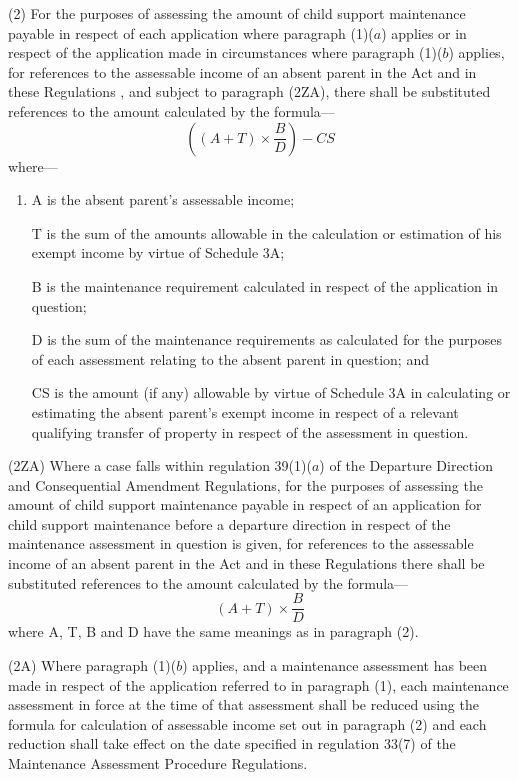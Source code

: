 \documentclass[a4paper]{article}
\begin{document}
(2) For the purposes of assessing the amount of child support maintenance payable in respect of each application where 
paragraph (1)($a$)  %
applies
or in respect of the application made in circumstances where paragraph (1)($b$) applies, %
for references to the assessable income of an absent parent in the Act and in these Regulations%
, and subject to paragraph (2ZA),  %
there shall be substituted references to the amount calculated by the formula—
\[ \left( (A + T) \times \frac{B}{D}\right) - CS\]
where—
\begin{enumerate}\item[]
A is the absent parent’s assessable income;

T is the sum of the amounts allowable in the calculation or estimation of his exempt income by virtue of Schedule 3A;

B is the maintenance requirement calculated in respect of the application in question;

D is the sum of the maintenance requirements as calculated for the purposes of each assessment relating to the absent parent in question; and

CS is the amount (if any) allowable by virtue of Schedule 3A in calculating or estimating the absent parent’s exempt income in respect of a relevant qualifying transfer of property in respect of the assessment in question.
\end{enumerate}

(2ZA) Where a case falls within regulation 39(1)($a$) of the Departure Direction
and Consequential Amendment Regulations, for the purposes of assessing the
amount of child support maintenance payable in respect of an application for
child support maintenance before a departure direction in respect of the
maintenance assessment in question is given, for references to the assessable
income of an absent parent in the Act and in these Regulations there shall be
substituted references to the amount calculated by the formula—
\[(A + T) \times \frac{B}{D}\]
where A, T, B and D have the same meanings as in paragraph (2).

(2A) Where paragraph (1)($b$) applies, and a maintenance assessment has been made in respect of the application referred to in paragraph (1), each maintenance assessment in force at the time of that assessment shall be reduced using the formula for calculation of assessable income set out in paragraph (2) and each reduction shall take effect on the date specified in regulation 33(7) of the Maintenance Assessment Procedure Regulations.
\end{document}
